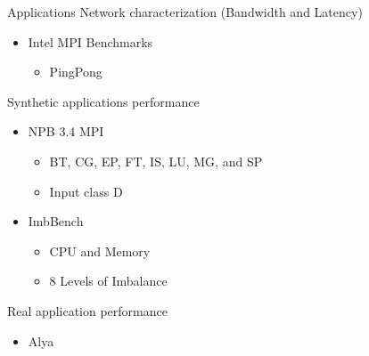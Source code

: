 \documentclass[presentation]{beamer}
\begin{document}
\begin{frame}{Applications}
Network characterization (Bandwidth and Latency)
    \begin{itemize}
        \item Intel MPI Benchmarks 
        \begin{itemize}
            \item PingPong
        \end{itemize}
    \end{itemize}
    \pause \vfill
Synthetic applications performance
    \begin{itemize}
        \item NPB 3.4 MPI
        \begin{itemize}
            \item BT, CG, EP, FT, IS, LU, MG, and SP
            \item Input class D
        \pause \vfill
        \end{itemize}
        \item ImbBench 
        \begin{itemize}
            \item CPU and Memory
            \item 8 Levels of Imbalance
        \end{itemize}
        \end{itemize}
        \pause \vfill
Real application performance
    \begin{itemize}
        \item Alya
    \end{itemize}
\end{frame}
\end{document}
